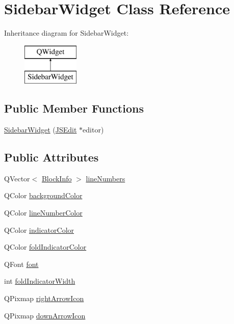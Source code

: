 \hypertarget{class_sidebar_widget}{}\section{Sidebar\+Widget Class Reference}
\label{class_sidebar_widget}
Inheritance diagram for Sidebar\+Widget\+:\begin{figure}[H]
\begin{center}
\leavevmode
\includegraphics[height=2.000000cm]{class_sidebar_widget}
\end{center}
\end{figure}
\subsection*{Public Member Functions}
\begin{DoxyCompactItemize}
\item 
\hyperlink{class_sidebar_widget_adb5e207d7e93d3716178199118451364}{Sidebar\+Widget} (\hyperlink{class_j_s_edit}{J\+S\+Edit} $\ast$editor)
\end{DoxyCompactItemize}
\subsection*{Public Attributes}
\begin{DoxyCompactItemize}
\item 
Q\+Vector$<$ \hyperlink{struct_block_info}{Block\+Info} $>$ \hyperlink{class_sidebar_widget_ac6820d4338c9763dd3b6a2da710a0fb0}{line\+Numbers}
\item 
Q\+Color \hyperlink{class_sidebar_widget_a71151528db89c451ad8aa0c31694c27a}{background\+Color}
\item 
Q\+Color \hyperlink{class_sidebar_widget_a0a577ea7fe9a4f2075fa19d1e601f987}{line\+Number\+Color}
\item 
Q\+Color \hyperlink{class_sidebar_widget_a0221f90d581113d83c73af06e1738067}{indicator\+Color}
\item 
Q\+Color \hyperlink{class_sidebar_widget_afa52fb75135fc07142c40b10b6255fa5}{fold\+Indicator\+Color}
\item 
Q\+Font \hyperlink{class_sidebar_widget_a8c38342a3799d3bfbe9671b3f5d28e1f}{font}
\item 
int \hyperlink{class_sidebar_widget_a8be447556cc4ec612153b05eec332513}{fold\+Indicator\+Width}
\item 
Q\+Pixmap \hyperlink{class_sidebar_widget_a7af9c03c7765c0ba88116fb397de74b5}{right\+Arrow\+Icon}
\item 
Q\+Pixmap \hyperlink{class_sidebar_widget_af4a932d3ba2010fe06b78a7253d39d8b}{down\+Arrow\+Icon}
\end{DoxyCompactItemize}
